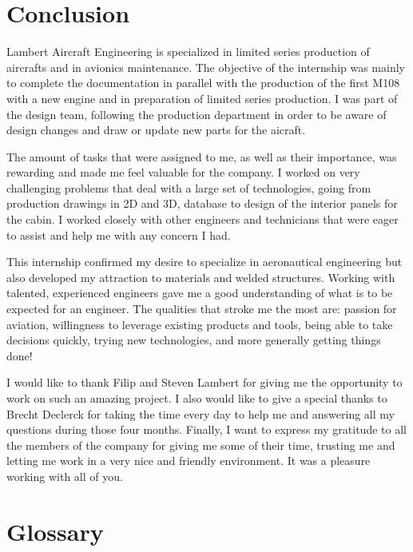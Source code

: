 \documentclass[11pt,a4paper]{article}
\begin{document}
\section{Conclusion}
Lambert Aircraft Engineering is specialized in limited series production of aircrafts and in avionics maintenance. The objective of the internship was mainly to complete the documentation in parallel with the production of the first M108 with a new engine and in preparation of limited series production. I was part of the design team, following the production department in order to be aware of design changes and draw or update new parts for the aicraft.

\bigskip

The amount of tasks that were assigned to me, as well as their importance, was rewarding and made me feel valuable for the company. I worked on very challenging problems that deal with a large set of technologies, going from production drawings in 2D and 3D, database to design of the interior panels for the cabin. I worked closely with other engineers and technicians that were eager to assist and help me with any concern I had.

\bigskip

This internship confirmed my desire to specialize in aeronautical engineering but also developed my attraction to materials and welded structures. Working with talented, experienced engineers gave me a good understanding of what is to be expected for an engineer. The qualities that stroke me the most are: passion for aviation, willingness to leverage existing products and tools, being able to take decisions quickly, trying new technologies, and more generally getting things done!

\bigskip

I would like to thank Filip and Steven Lambert for giving me the opportunity to work on such an amazing project. I also would like to give a special thanks to Brecht Declerck for taking the time every day to help me and answering all my questions during those four months. Finally, I want to express my gratitude to all the members of the company for giving me some of their time, trusting me and letting me work in a very nice and friendly environment. It was a pleasure working with all of you.

\newpage

\section{Glossary} 
\label{sec:glossary}
\end{document}
